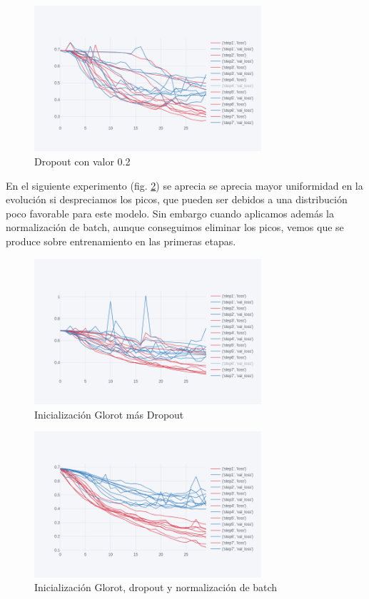 \begin{figure}[H]
	\centering
	\includegraphics[width=0.75\textwidth]{imaxes/dropout0_2.png}
	\caption{Dropout con valor 0.2}
	\label{dropout02}
\end{figure}

En el siguiente experimento (fig. \ref{glorot}) se aprecia se aprecia mayor uniformidad en la evolución si despreciamos los picos, que pueden ser debidos a una distribución poco favorable para este modelo. Sin embargo cuando aplicamos además la normalización de batch, aunque conseguimos eliminar los picos, vemos que se produce sobre entrenamiento en las primeras etapas.


\begin{figure}[H]
	\centering
	\includegraphics[width=0.75\textwidth]{imaxes/glorot.png}
	\caption{Inicialización Glorot más Dropout}
	\label{glorot}
\end{figure}

\begin{figure}[H]
	\centering
	\includegraphics[width=0.75\textwidth]{imaxes/glorot_bn.png}
	\caption{Inicialización Glorot, dropout y normalización de batch}
	\label{glorotbn}
\end{figure}

